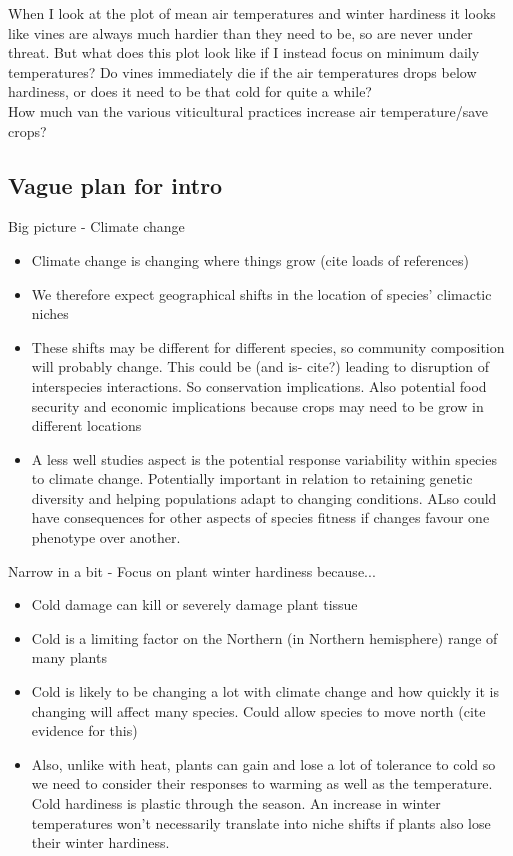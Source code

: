 \documentclass[11pt,letter]{article}
\begin{document}
When I look at the plot of mean air temperatures and winter hardiness it looks like vines are always much hardier than they need to be, so are never under threat. But what does this plot look like if I instead focus on minimum daily temperatures? Do vines immediately die if the air temperatures drops below hardiness, or does it need to be that cold for quite a while? \\

How much van the various viticultural practices increase air temperature/save crops?\\

\subsection{Vague plan for intro}

Big picture - Climate change 
\begin{itemize}
  \item Climate change is changing where things grow (cite loads of references) 
  \item We therefore expect geographical shifts in the location of species' climactic niches
  \item These shifts may be different for different species, so community composition will probably change. This could be (and is- cite?) leading to disruption of interspecies interactions. So conservation implications. Also potential food security and economic implications because crops may need to be grow in different locations
  \item A less well studies aspect is the potential response variability within species to climate change. Potentially important in relation to retaining genetic diversity and helping populations adapt to changing conditions. ALso could have consequences for other aspects of species fitness if changes favour one phenotype over another. 
\end{itemize}

Narrow in a bit - Focus on plant winter hardiness because...
\begin{itemize}
  \item Cold damage can kill or severely damage plant tissue
  \item Cold is a limiting factor on the Northern (in Northern hemisphere) range of many plants
  \item Cold is likely to be changing a lot with climate change and how quickly it is changing will affect many species. Could allow species to move north (cite evidence for this)
  \item Also, unlike with heat, plants can gain and lose a lot of tolerance to cold so we need to consider their responses to warming as well as the temperature. Cold hardiness is plastic through the season. An increase in winter temperatures won't necessarily translate into niche shifts if plants also lose their winter hardiness. 
\end{itemize}
\end{document}
